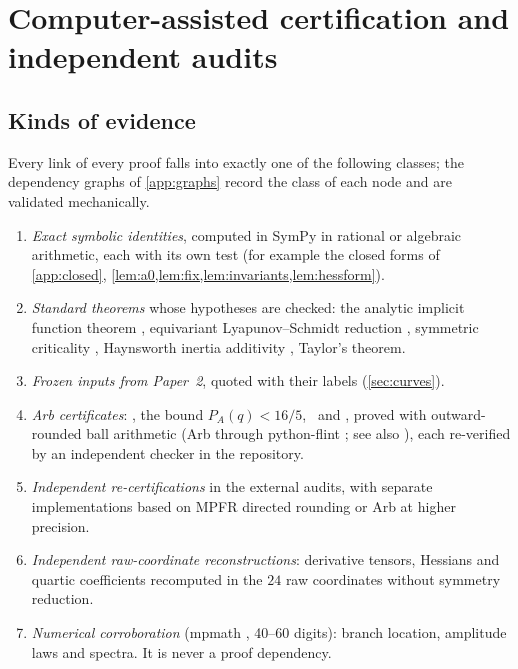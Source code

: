 \section{Computer-assisted certification and independent audits}\label{sec:cert}

\subsection{Kinds of evidence}

Every link of every proof falls into exactly one of the following classes; the dependency graphs of \cref{app:graphs}
record the class of each node and are validated mechanically.
\begin{enumerate}[label=(\alph*)]
\item \emph{Exact symbolic identities}, computed in SymPy \citep{SymPy2017} in rational or algebraic arithmetic, each
with its own test (for example the closed forms of \cref{app:closed}, \cref{lem:a0,lem:fix,lem:invariants,lem:hessform}).
\item \emph{Standard theorems} whose hypotheses are checked: the analytic implicit function theorem
\citep{KrantzParks2013}, equivariant Lyapunov--Schmidt reduction
\citep{GolubitskySchaeffer1985,GolubitskyStewartSchaeffer1988,Kielhoefer2012}, symmetric criticality
\citep{Palais1979}, Haynsworth inertia additivity \citep{Haynsworth1968}, Taylor's theorem.
\item \emph{Frozen inputs from Paper~2}, quoted with their labels (\cref{sec:curves}).
\item \emph{Arb certificates}: \lemM, the bound $P_A(q)<16/5$, \lemK\ and \lemQ, proved with outward-rounded ball arithmetic
(Arb through python-flint \citep{Johansson2017,PythonFlint}; see also \citep{MooreKearfottCloud2009,Tucker2011}), each
re-verified by an independent checker in the repository.
\item \emph{Independent re-certifications} in the external audits, with separate implementations based on MPFR directed
rounding \citep{Fousse2007} or Arb at higher precision.
\item \emph{Independent raw-coordinate reconstructions}: derivative tensors, Hessians and quartic coefficients recomputed in
the $24$ raw coordinates without symmetry reduction.
\item \emph{Numerical corroboration} (mpmath \citep{mpmath}, 40--60 digits): branch location, amplitude laws and spectra.
It is never a proof dependency.
\end{enumerate}

